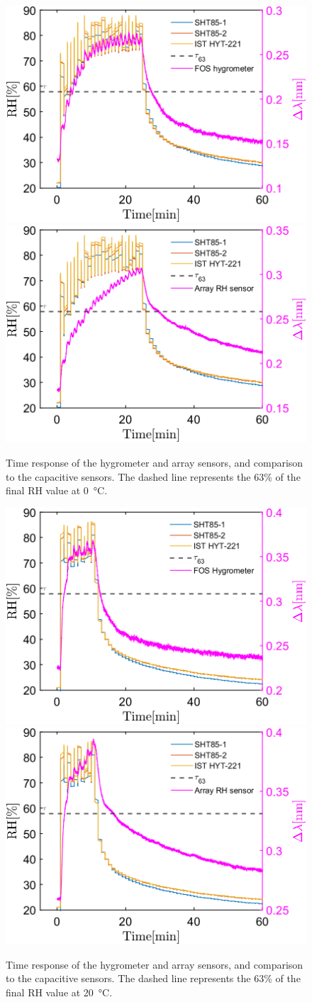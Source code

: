 \begin{figure}[!h]
\centering
\includegraphics[width=0.47\columnwidth]{Chapter5/images/20responseRH.png}
\includegraphics[width=0.47\columnwidth]{Chapter5/images/20responseRH2.png}
\caption{Time response of the hygrometer and array sensors, and comparison to the capacitive sensors. The dashed line represents the 63\% of the final \gls{RH} value at \SI{0}{\celsius}.}
\label{fig_time_response}
\end{figure}

\begin{figure}[!h]
\centering
\includegraphics[width=0.47\columnwidth]{Chapter5/images/020responseRH.png}
\includegraphics[width=0.47\columnwidth]{Chapter5/images/020responseRH2.png}
\caption{Time response of the hygrometer and array sensors, and comparison to the capacitive sensors. The dashed line represents the 63\% of the final \gls{RH} value at \SI{20}{\celsius}.}
\label{fig_time_response2}
\end{figure}


